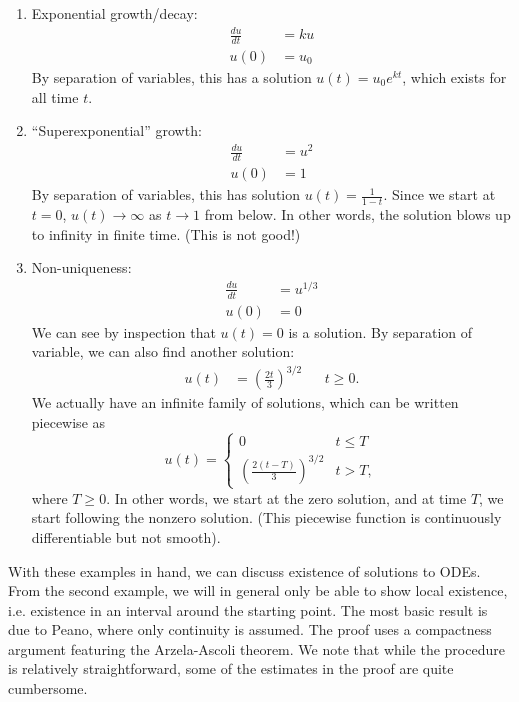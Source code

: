 \documentclass[12pt]{amsart}         %
\theoremstyle{remark}
\begin{document}
\begin{enumerate}
\item Exponential growth/decay:
\begin{align*}
\frac{du}{dt} &= k u \\
u(0) &= u_0 
\end{align*}
By separation of variables, this has a solution $u(t) = u_0 e^{kt}$, which exists for all time $t$.

\item ``Superexponential'' growth:
\begin{align*}
\frac{du}{dt} &= u^2 \\
u(0) &= 1
\end{align*}
By separation of variables, this has solution $u(t) = \frac{1}{1 - t}$. Since we start at $t = 0$, $u(t) \rightarrow \infty$ as $t \rightarrow 1$ from below. In other words, the solution blows up to infinity in finite time. (This is not good!)

\item Non-uniqueness:
\begin{align*}
\frac{du}{dt} &= u^{1/3} \\
u(0) &= 0
\end{align*}
We can see by inspection that $u(t) = 0$ is a solution. By separation of variable, we can also find another solution:
\begin{align*}
u(t) &= \left( \frac{2t}{3} \right)^{3/2} && t \geq 0.
\end{align*}
We actually have an infinite family of solutions, which can be written piecewise as
\[
u(t) = \begin{cases}
0 & t \leq T \\
\left( \frac{2(t-T)}{3} \right)^{3/2} & t > T,
\end{cases}
\]
where $T \geq 0$. In other words, we start at the zero solution, and at time $T$, we start following the nonzero solution. (This piecewise function is continuously differentiable but not smooth).
\end{enumerate}

With these examples in hand, we can discuss existence of solutions to ODEs. From the second example, we will in general only be able to show local existence, i.e. existence in an interval around the starting point. The most basic result is due to Peano, where only continuity is assumed. The proof uses a compactness argument featuring the Arzela-Ascoli theorem. We note that while the procedure is relatively straightforward, some of the estimates in the proof are quite cumbersome.
\end{document}
